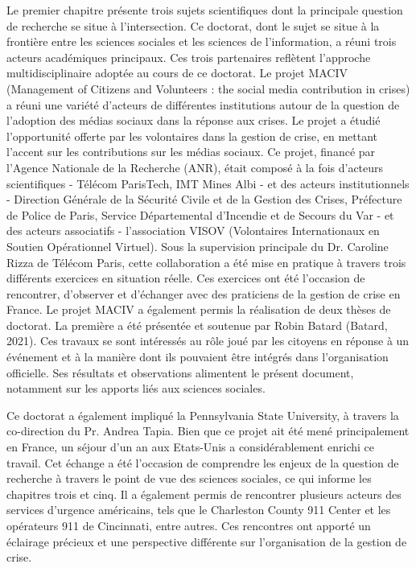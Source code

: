 Le premier chapitre présente trois sujets scientifiques dont la principale question de recherche se situe à l'intersection.
Ce doctorat, dont le sujet se situe à la frontière entre les sciences sociales et les sciences de l'information, a réuni trois acteurs académiques principaux.
Ces trois partenaires reflètent l'approche multidisciplinaire adoptée au cours de ce doctorat.
Le projet MACIV (Management of Citizens and Volunteers : the social media contribution in crises) a réuni une variété d'acteurs de différentes institutions autour de la question de l'adoption des médias sociaux dans la réponse aux crises.
Le projet a étudié l'opportunité offerte par les volontaires dans la gestion de crise, en mettant l'accent sur les contributions sur les médias sociaux.
Ce projet, financé par l'Agence Nationale de la Recherche (ANR), était composé à la fois d'acteurs scientifiques - Télécom ParisTech, IMT Mines Albi - et des acteurs institutionnels - Direction Générale de la Sécurité Civile et de la Gestion des Crises, Préfecture de Police de Paris, Service Départemental d'Incendie et de Secours du Var - et des acteurs associatifs - l'association VISOV (Volontaires Internationaux en Soutien Opérationnel Virtuel).
Sous la supervision principale du Dr. Caroline Rizza de Télécom Paris, cette collaboration a été mise en pratique à travers trois différents exercices en situation réelle.
Ces exercices ont été l'occasion de rencontrer, d'observer et d'échanger avec des praticiens de la gestion de crise en France.
Le projet MACIV a également permis la réalisation de deux thèses de doctorat.
La première a été présentée et soutenue par Robin Batard (Batard, 2021).
Ces travaux se sont intéressés au rôle joué par les citoyens en réponse à un événement et à la manière dont ils pouvaient être intégrés dans l'organisation officielle.
Ses résultats et observations alimentent le présent document, notamment sur les apports liés aux sciences sociales.

Ce doctorat a également impliqué la Pennsylvania State University, à travers la co-direction du Pr. Andrea Tapia. Bien que ce projet ait été mené principalement en France, un séjour d'un an aux Etats-Unis a considérablement enrichi ce travail.
Cet échange a été l'occasion de comprendre les enjeux de la question de recherche à travers le point de vue des sciences sociales, ce qui informe les chapitres trois et cinq.
Il a également permis de rencontrer plusieurs acteurs des services d'urgence américains, tels que le Charleston County 911 Center et les opérateurs 911 de Cincinnati, entre autres.
Ces rencontres ont apporté un éclairage précieux et une perspective différente sur l'organisation de la gestion de crise.

